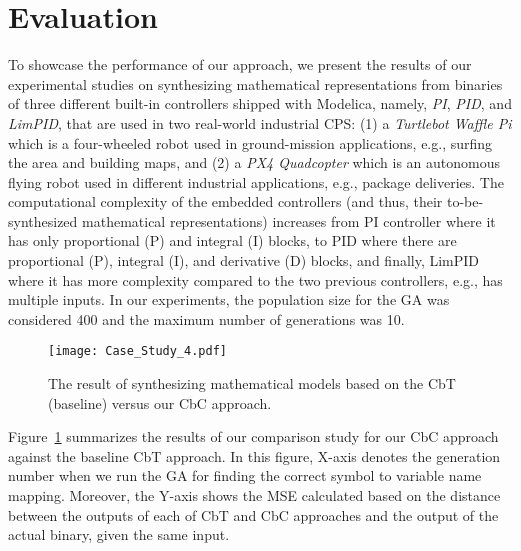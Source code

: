 \documentclass[10pt,conference]{IEEEtran}
\begin{document}
\section{Evaluation}
\label{sec:PreliminaryResult}
To showcase the performance of our approach, we present the results of our experimental studies on synthesizing mathematical representations from binaries of three different built-in controllers shipped with Modelica, namely, \textit{PI}, \textit{PID}, and \textit{LimPID}, that are used in two real-world industrial CPS: (1) a \textit{Turtlebot Waffle Pi} which is a four-wheeled robot used in ground-mission applications, e.g., surfing the area and building maps, and (2) a \textit{PX4 Quadcopter} which is an autonomous flying robot used in different industrial applications, e.g., package deliveries. The computational complexity of the embedded controllers (and thus, their to-be-synthesized mathematical representations) increases from PI controller where it has only proportional (P) and integral (I) blocks, to PID where there are proportional (P), integral (I), and derivative (D) blocks, and finally, LimPID where it has more complexity compared to the two previous controllers, e.g., has multiple inputs.
In our experiments, the population size for the GA was considered 400 and the maximum number of generations was 10.
%
\begin{figure}[ht]
  \centering
  \texttt{[image: Case\_Study\_4.pdf]}
  \caption{The result of synthesizing mathematical models based on the CbT (baseline) versus our CbC approach.}
  \label{fig:correct_by_construct_result}
\end{figure}
%
 Figure~\ref{fig:correct_by_construct_result} summarizes the results of our comparison study for our CbC approach against the baseline CbT approach. In this figure, X-axis denotes the generation number when we run the GA for finding the correct symbol to variable name mapping. Moreover, the Y-axis shows the MSE calculated based on the distance between the outputs of each of CbT and CbC approaches and the output of the actual binary, given the same input. 
\end{document}
